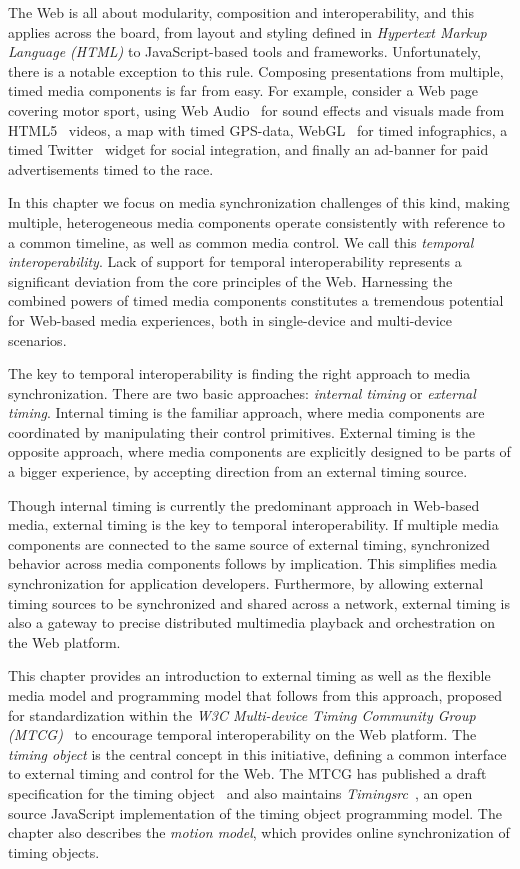 The Web is all about modularity, composition and interoperability, and this
applies across the board, from layout and styling defined in \emph{Hypertext
Markup Language (HTML)} to JavaScript-based tools and frameworks.
Unfortunately, there is a notable exception to this rule. Composing
presentations from multiple, timed media components is far from easy. For
example, consider a Web page covering motor sport, using Web
Audio~\cite{webaudio} for sound effects and visuals made from HTML5~\cite{html5} videos, a
map with timed GPS-data, WebGL~\cite{webgl} for timed infographics, a timed
Twitter~\cite{twitter} widget for social integration, and finally an ad-banner
for paid advertisements timed to the race.

In this chapter we focus on media synchronization challenges of this kind,
making multiple, heterogeneous media components operate consistently with
reference to a common timeline, as well as common media control. We call this
\emph{temporal interoperability}. Lack of support for temporal
interoperability represents a significant deviation from the core principles
of the Web. Harnessing the combined powers of timed media components
constitutes a tremendous potential for Web-based media experiences, both in
single-device and multi-device scenarios.

The key to temporal interoperability is finding the right approach to media
synchronization. There are two basic approaches: \emph{internal
timing} or \emph{external timing}. Internal timing
is the familiar approach, where media components are coordinated by
manipulating their control primitives. External timing is the
opposite approach, where media components are explicitly designed to be parts
of a bigger experience, by accepting direction from an external timing source.

Though internal timing is currently the predominant approach in Web-based media, 
external timing is the key to temporal interoperability.
If multiple media components are connected to the same source of external timing,
synchronized behavior across media components follows by implication. This
simplifies media synchronization for application developers. Furthermore,
by allowing external timing sources to be synchronized and shared across a
network, external timing is also a gateway to precise distributed multimedia
playback and orchestration on the Web platform.

This chapter provides an introduction to external timing as well as the
flexible media model and programming model that follows from this approach,
proposed for standardization within the \emph{W3C Multi-device Timing
Community Group (MTCG)}~\cite{mtcg} to encourage temporal interoperability on
the Web platform. The \emph{timing object} is the central concept in this
initiative, defining a common interface to external timing and control for the
Web. The MTCG has published a draft specification for the timing
object~\cite{timingobject} and also maintains
\emph{Timingsrc}~\cite{timingsrc}, an open source JavaScript implementation of
the timing object programming model. The chapter also describes the
\emph{motion model}, which provides online synchronization of timing objects.

